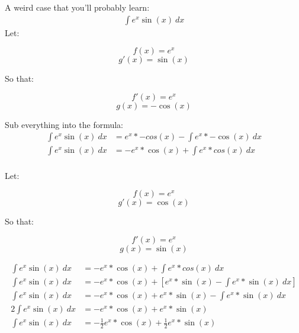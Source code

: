 	\begin{simple}[colback=aliceblue, colframe=airforceblue]{}{}
	A weird case that you'll probably learn:
	\begin{align*}
	\int e^x\sin{(x)}\ dx
	\end{align*}
	Let:
	\begin{multicols}{2}
	\noindent
	\begin{equation*}
	f(x)=e^x
	\end{equation*}
	\begin{equation*}
	g'(x)=\sin (x)
	\end{equation*}
	\end{multicols}
	\noindent So that:
	\begin{multicols}{2}
	\noindent
	\begin{equation*}
	f'(x)=e^x
	\end{equation*}
	\begin{equation*}
	g(x)=-\cos (x)
	\end{equation*}
	\end{multicols}
	
	Sub everything into the formula:
	\begin{align*}
	\int e^x\sin{(x)}\ dx&=e^x*-cos (x)-\int e^x*-\cos (x)\ dx\\
	\int e^x\sin{(x)}\ dx&=-e^x * \cos (x)+\int e^x*cos (x)\ dx\\
	\end{align*}
	
	\newpage	
	
	Let:
	\begin{multicols}{2}
	\noindent
	\begin{equation*}
	f(x)=e^x
	\end{equation*}
	\begin{equation*}
	g'(x)=\cos (x)
	\end{equation*}
	\end{multicols}
	\noindent So that:
	\begin{multicols}{2}
	\noindent
	\begin{equation*}
	f'(x)=e^x
	\end{equation*}
	\begin{equation*}
	g(x)=\sin (x)
	\end{equation*}
	\end{multicols}
	
	\begin{align*}
	\int e^x\sin{(x)}\ dx&=-e^x*\cos{(x)}+\int e^x*cos(x)\ dx\\
	\int e^x\sin{(x)}\ dx&=-e^x*\cos{(x)}+\left[e^x*\sin{(x)}-\int e^x*\sin{(x)}\ dx\right]\\
	\int e^x\sin{(x)}\ dx&=-e^x*\cos{(x)}+e^x*\sin{(x)}-\int e^x*\sin{(x)}\ dx\\
	2\int e^x\sin{(x)}\ dx&=-e^x*\cos{(x)}+e^x*\sin{(x)}\\
	\int e^x\sin{(x)}\ dx&=-\frac{1}{2}e^x*\cos{(x)}+\frac{1}{2}e^x*\sin{(x)}
	\end{align*}
	\end{simple}
	
